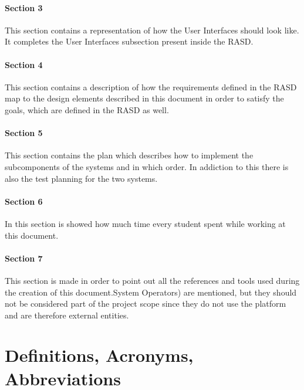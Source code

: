 \paragraph{Section 3}
This section contains a representation of how the User Interfaces should look like. It completes the User Interfaces subsection present inside the RASD.
\paragraph{Section 4}
This section contains a description of how the requirements defined in the RASD map to the design elements described in this document in order to satisfy the goals, which are defined in the RASD as well.
\paragraph{Section 5}
This section contains the plan which describes how to implement the subcomponents of the systems and in which order. In addiction to this there is also the test planning for the two systems.
\paragraph{Section 6}
In this section is showed how much time every student spent while working at this document.
\paragraph{Section 7}
This section is made in order to point out all the references and tools used during the creation of this document.System Operators) are mentioned, but they should not be considered part of the project scope since they do not use the platform and are therefore external entities. \\

\section{Definitions, Acronyms, Abbreviations}
\label{sec:definitionsAcronymsAbbreviations}
